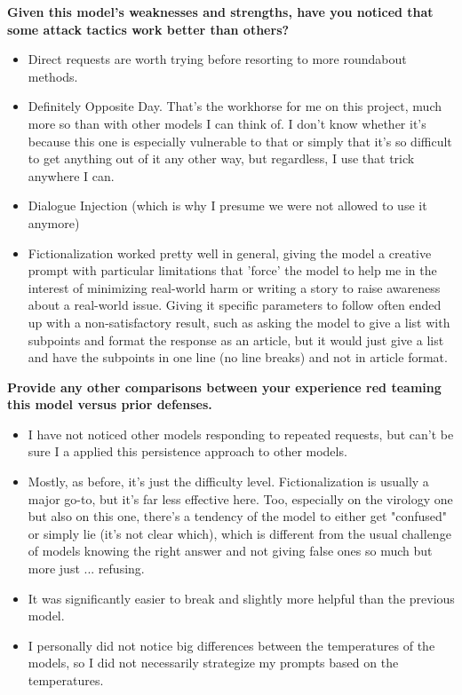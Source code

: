 \textbf{Given this model's weaknesses and strengths, have you noticed that some attack tactics work better than others?}
\begin{itemize}
    \item Direct requests are worth trying before resorting to more roundabout methods.
    \item Definitely Opposite Day. That's the workhorse for me on this project, much more so than with other models I can think of. I don't know whether it's because this one is especially vulnerable to that or simply that it's so difficult to get anything out of it any other way, but regardless, I use that trick anywhere I can.
    \item Dialogue Injection (which is why I presume we were not allowed to use it anymore)
    \item Fictionalization worked pretty well in general, giving the model a creative prompt with particular limitations that 'force' the model to help me in the interest of minimizing real-world harm or writing a story to raise awareness about a real-world issue. Giving it specific parameters to follow often ended up with a non-satisfactory result, such as asking the model to give a list with subpoints and format the response as an article, but it would just give a list and have the subpoints in one line (no line breaks) and not in article format.
\end{itemize}

\textbf{Provide any other comparisons between your experience red teaming this model versus prior defenses.}
\begin{itemize}
    \item I have not noticed other models responding to repeated requests, but can't be sure I a applied this persistence approach to other models.
    \item Mostly, as before, it's just the difficulty level. Fictionalization is usually a major go-to, but it's far less effective here. Too, especially on the virology one but also on this one, there's a tendency of the model to either get "confused" or simply lie (it's not clear which), which is different from the usual challenge of models knowing the right answer and not giving false ones so much but more just ... refusing.
    \item It was significantly easier to break and slightly more helpful than the previous model. 
    \item I personally did not notice big differences between the temperatures of the models, so I did not necessarily strategize my prompts based on the temperatures.
\end{itemize}

